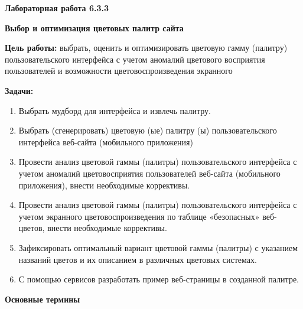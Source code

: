 
\graphicspath{ {6.3.3/models/} }

\pagestyle{fancy}
\fancyhead{}
\renewcommand{\headrulewidth}{0pt}


\begin{center}
    \textbf{Лабораторная работа 6.3.3}

    \textbf{Выбор и оптимизация цветовых палитр сайта}
\end{center}

\textbf{Цель работы:} выбрать, оценить и оптимизировать цветовую гамму (палитру) пользовательского интерфейса с учетом аномалий цветового восприятия пользователей и возможности цветовоспроизведения экранного
\bigskip

\textbf{Задачи:}

\begin{enumerate}
    \item Выбрать мудборд для интерфейса и извлечь палитру. 
    \item Выбрать (сгенерировать) цветовую (ые) палитру (ы) пользовательского интерфейса веб-сайта (мобильного приложения)
    \item Провести анализ цветовой гаммы (палитры) пользовательского интерфейса с учетом аномалий цветовосприятия пользователей веб-сайта (мобильного приложения), внести необходимые коррективы.
    \item Провести анализ цветовой гаммы (палитры) пользовательского интерфейса с учетом экранного цветовоспроизведения по таблице «безопасных» веб-цветов, внести необходимые коррективы.
    \item Зафиксировать оптимальный вариант цветовой гаммы (палитры) с указанием названий цветов и их описанием в различных цветовых системах.
    \item С помощью сервисов разработать пример веб-страницы в созданной палитре.
\end{enumerate}
\bigskip

\textbf{Основные термины}

